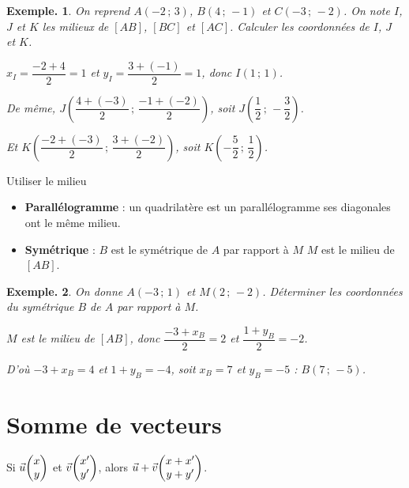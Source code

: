 \documentclass[12pt]{article}
\theoremstyle{break}
\newtheorem*{example}{Exemple.}
\begin{document}
\begin{example}
  On reprend $A(-2\,;\,3)$, $B(4\,;\,-1)$ et $C(-3\,;\,-2)$. On note $I$, $J$ et $K$ les milieux de $[AB]$, $[BC]$ et $[AC]$. Calculer les coordonnées de $I$, $J$ et $K$.
  \begin{reponse}
    $x_I = \dfrac{-2 + 4}{2} = 1$ \quad et \quad $y_I = \dfrac{3 + (-1)}{2} = 1$, \quad donc $I(1\,;\,1)$.

    \smallskip
    De même, $J\left(\dfrac{4 + (-3)}{2}\,;\,\dfrac{-1 + (-2)}{2}\right)$, soit $J\left(\dfrac{1}{2}\,;\,-\dfrac{3}{2}\right)$.

    \smallskip
    Et $K\left(\dfrac{-2 + (-3)}{2}\,;\,\dfrac{3 + (-2)}{2}\right)$, soit $K\left(-\dfrac{5}{2}\,;\,\dfrac{1}{2}\right)$.
  \end{reponse}
\end{example}

\begin{method}{Utiliser le milieu}{}
  \begin{itemize}
    \item \textbf{Parallélogramme} : un quadrilatère est un parallélogramme \ssi ses diagonales ont le même milieu.
    \item \textbf{Symétrique} : $B$ est le symétrique de $A$ par rapport à $M$ \ssi $M$ est le milieu de $[AB]$.
  \end{itemize}
\end{method}

\begin{example}
  On donne $A(-3\,;\,1)$ et $M(2\,;\,-2)$. Déterminer les coordonnées du symétrique $B$ de $A$ par rapport à $M$.
  \begin{reponse}
    $M$ est le milieu de $[AB]$, donc $\dfrac{-3 + x_B}{2} = 2$ et $\dfrac{1 + y_B}{2} = -2$.

    D'où $-3 + x_B = 4$ et $1 + y_B = -4$, soit $x_B = 7$ et $y_B = -5$ : $B(7\,;\,-5)$.
  \end{reponse}
\end{example}

\newpage
\section{Somme de vecteurs}

\begin{proposition}{}{}
  \begin{multihide}
    Si $\vec u\col{x}{y}$ et $\vec v\col{x'}{y'}$, alors $\vec u + \vec v\col{x + x'}{y + y'}$.
  \end{multihide}
\end{proposition}
\end{document}
